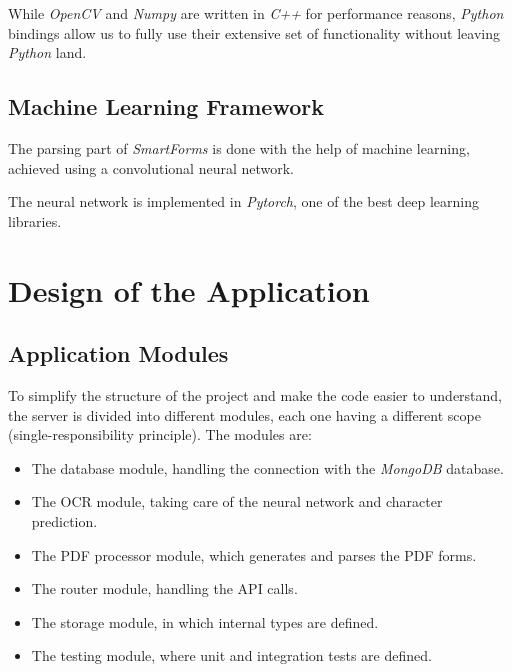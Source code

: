 \documentclass[11pt, a4paper]{report}
\begin{document}
While \textit{OpenCV} and \textit{Numpy} are written in \textit{C++} for performance reasons, \textit{Python} bindings allow us to fully use their extensive set of functionality without leaving \textit{Python} land.

\section{Machine Learning Framework}

The parsing part of \textit{SmartForms} is done with the help of machine learning, achieved using a convolutional neural network.

The neural network is implemented in \textit{Pytorch}, one of the best deep learning libraries.




\chapter{Design of the Application}


\section{Application Modules}

To simplify the structure of the project and make the code easier to understand, the server is divided into different modules, each one having a different scope (single-responsibility principle). The modules are:
\begin{itemize}
    \item The database module, handling the connection with the \textit{MongoDB} database.
    \item The OCR module, taking care of the neural network and character prediction.
    \item The PDF processor module, which generates and parses the PDF forms.
    \item The router module, handling the API calls.
    \item The storage module, in which internal types are defined.
    \item The testing module, where unit and integration tests are defined.
\end{itemize}
\end{document}
